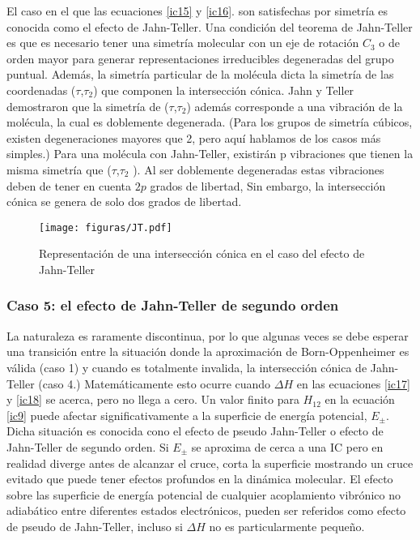 \documentclass[12pt]{report}
\begin{document}
El caso en el que las ecuaciones \ref{ic15} y \ref{ic16}. son satisfechas por simetría es conocida como el efecto de Jahn-Teller. Una condición del teorema de Jahn-Teller es que es necesario tener una simetría molecular con un eje de rotación  $C_3$ o de orden mayor para generar representaciones irreducibles degeneradas del grupo puntual. Además, la simetría particular de la molécula dicta la simetría de las coordenadas ($\tau$,$\tau_2$) que componen la intersección cónica.  Jahn y Teller demostraron que la simetría de ($\tau$,$\tau_2$) además corresponde a una vibración de la molécula, la cual es doblemente degenerada. (Para los grupos de simetría cúbicos, existen degeneraciones mayores que 2, pero aquí hablamos de los casos más simples.) Para una molécula con Jahn-Teller, existirán p vibraciones que tienen la misma simetría que ($\tau$,$\tau_2$ ). Al ser doblemente degeneradas estas vibraciones deben de tener en cuenta $2p$ grados de libertad, Sin embargo, la intersección cónica se genera de solo dos grados de libertad.

\begin{figure}[h]
\centering
\texttt{[image: figuras/JT.pdf]} 
\caption{Representación de una intersección cónica en el caso del efecto de Jahn-Teller }
\end{figure}

\newpage
\subsubsection{Caso 5: el efecto de Jahn-Teller de segundo orden}

La naturaleza es raramente discontinua, por lo que algunas veces se debe esperar una transición entre la situación donde la aproximación de Born-Oppenheimer es válida (caso 1) y cuando es totalmente invalida, la intersección cónica de Jahn-Teller (caso 4.) Matemáticamente esto ocurre cuando $\Delta H$ en las ecuaciones \ref{ic17} y \ref{ic18} se acerca, pero no llega a cero. Un valor finito para $H_12$ en la ecuación \ref{ic9} puede afectar significativamente a la superficie de energía potencial, $E_\pm$. Dicha situación es conocida cono el efecto de pseudo Jahn-Teller o efecto de Jahn-Teller de segundo orden. Si $E_\pm$ se aproxima de cerca a una IC pero en realidad diverge antes de alcanzar el cruce, corta la superficie mostrando un cruce evitado que puede tener efectos profundos en la dinámica molecular. El efecto sobre las superficie de energía potencial de cualquier acoplamiento vibrónico no adiabático entre diferentes estados electrónicos, pueden ser referidos como efecto de pseudo de Jahn-Teller, incluso si $\Delta H$ no es particularmente pequeño.
\end{document}
